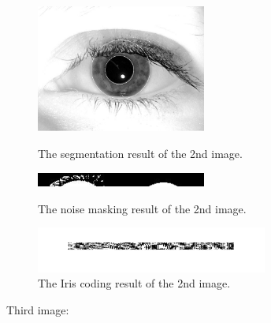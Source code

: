 \documentclass[a4paper]{article}
\begin{document}
\begin{spacing}{2.0}
\begin{enumerate}
	\begin{figure}[H]
	\begin{minipage}[t]{0.3\linewidth}
	\centering
	\includegraphics[width = 2.2in]{probe2segmented.jpg}
	\caption{The segmentation result of the 2nd image.}
	\label{seg}
	\end{minipage}
	\begin{minipage}[t]{0.3\linewidth}
	\centering
	\includegraphics[width = 2.2in]{probe2polarnoise.jpg}
	\caption{The noise masking result of the 2nd image.}
	\label{noiseM}
	\end{minipage}
	\begin{minipage}[t]{0.3\linewidth}
	\centering
	\includegraphics[width = 3in]{iriscoding2.jpg}
	\caption{The Iris coding result of the 2nd image.}
	\label{IC}
	\end{minipage}
	\end{figure}
	
	Third image:\\
	

\end{enumerate}
\end{spacing}
\end{document}
